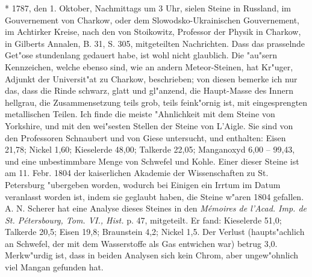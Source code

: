 \documentclass[a4paper, 11pt, oneside, polutonikogreek, german]{article}
\begin{document}
* 1787, den 1. Oktober, Nachmittags um 3 Uhr, sielen Steine in Russland, im Gouvernement von Charkow, oder dem Slowodsko-Ukrainischen Gouvernement, im Achtirker Kreise, nach den von Stoikowitz, Professor der Physik in Charkow, in Gilberts Annalen, B. 31, S. 305, mitgeteilten Nachrichten. Dass das prasselnde Get"ose stundenlang gedauert habe, ist wohl nicht glaublich. Die "au"sern Kennzeichen, welche ebenso sind, wie an andern Meteor-Steinen, hat Kr"uger, Adjunkt der Universit"at zu Charkow, beschrieben; von diesen bemerke ich nur das, dass die Rinde schwarz, glatt und gl"anzend, die Haupt-Masse des Innern hellgrau, die Zusammensetzung teils grob, teils feink"ornig ist, mit eingesprengten metallischen Teilen. Ich finde die meiste "Ahnlichkeit mit dem Steine von Yorkshire, und mit den wei"sesten Stellen der Steine von L'Aigle. Sie sind von den Professoren Schnaubert und von Giese untersucht, und enthalten: Eisen 21,78; Nickel 1,60; Kieselerde 48,00; Talkerde 22,05; Manganoxyd 6,00 -- 99,43, und eine unbestimmbare Menge von Schwefel und Kohle. Einer dieser Steine ist am 11. Febr. 1804 der kaiserlichen Akademie der Wissenschaften zu St. Petersburg "ubergeben worden, wodurch bei Einigen ein Irrtum im Datum veranlasst worden ist, indem sie geglaubt haben, die Steine w"aren 1804 gefallen. A. N. Scherer hat eine Analyse dieses Steines in den \emph{Mémoires de l'Acad. Imp. de St. Pétersbourg, Tom. VI., Hist.} p. 47, mitgeteilt. Er fand: Kieselerde 51,0; Talkerde 20,5; Eisen 19,8; Braunstein 4,2; Nickel 1,5. Der Verlust (haupts"achlich an Schwefel, der mit dem Wasserstoffe als Gas entwichen war) betrug 3,0. Merkw"urdig ist, dass in beiden Analysen sich kein Chrom, aber ungew"ohnlich viel Mangan gefunden hat.
\end{document}
